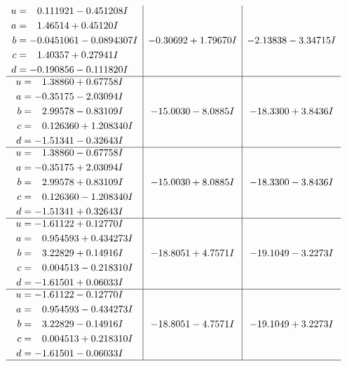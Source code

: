 \documentclass[1p]{elsarticle_modified}
\theoremstyle{definition}
\begin{document}
$$\begin{array}{c|c|c}
\begin{aligned}
u &= \phantom{-}0.111921 - 0.451208 I \\
a &= \phantom{-}1.46514 + 0.45120 I \\
b &= -0.0451061 - 0.0894307 I \\
c &= \phantom{-}1.40357 + 0.27941 I \\
d &= -0.190856 - 0.111820 I\end{aligned}
 & -0.30692 + 1.79670 I & -2.13838 - 3.34715 I \\ \hline\begin{aligned}
u &= \phantom{-}1.38860 + 0.67758 I \\
a &= -0.35175 - 2.03094 I \\
b &= \phantom{-}2.99578 - 0.83109 I \\
c &= \phantom{-}0.126360 + 1.208340 I \\
d &= -1.51341 - 0.32643 I\end{aligned}
 & -15.0030 - 8.0885 I & -18.3300 + 3.8436 I \\ \hline\begin{aligned}
u &= \phantom{-}1.38860 - 0.67758 I \\
a &= -0.35175 + 2.03094 I \\
b &= \phantom{-}2.99578 + 0.83109 I \\
c &= \phantom{-}0.126360 - 1.208340 I \\
d &= -1.51341 + 0.32643 I\end{aligned}
 & -15.0030 + 8.0885 I & -18.3300 - 3.8436 I \\ \hline\begin{aligned}
u &= -1.61122 + 0.12770 I \\
a &= \phantom{-}0.954593 + 0.434273 I \\
b &= \phantom{-}3.22829 + 0.14916 I \\
c &= \phantom{-}0.004513 - 0.218310 I \\
d &= -1.61501 + 0.06033 I\end{aligned}
 & -18.8051 + 4.7571 I & -19.1049 - 3.2273 I \\ \hline\begin{aligned}
u &= -1.61122 - 0.12770 I \\
a &= \phantom{-}0.954593 - 0.434273 I \\
b &= \phantom{-}3.22829 - 0.14916 I \\
c &= \phantom{-}0.004513 + 0.218310 I \\
d &= -1.61501 - 0.06033 I\end{aligned}
 & -18.8051 - 4.7571 I & -19.1049 + 3.2273 I\\
 \hline 
 \end{array}$$\newpage\newpage\renewcommand{\arraystretch}{1}
\end{document}
